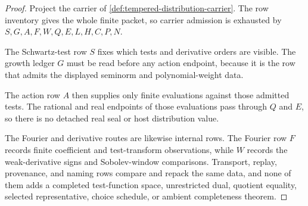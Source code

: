 \begin{proof}
Project the carrier of \autoref{def:tempered-distribution-carrier}. The row inventory gives the whole finite packet, so carrier admission is exhausted by $S,G,A,F,W,Q,E,L,H,C,P,N$.

The Schwartz-test row $S$ fixes which tests and derivative orders are visible. The growth ledger $G$ must be read before any action endpoint, because it is the row that admits the displayed seminorm and polynomial-weight data.

The action row $A$ then supplies only finite evaluations against those admitted tests. The rational and real endpoints of those evaluations pass through $Q$ and $E$, so there is no detached real seal or host distribution value.

The Fourier and derivative routes are likewise internal rows. The Fourier row $F$ records finite coefficient and test-transform observations, while $W$ records the weak-derivative signs and Sobolev-window comparisons. Transport, replay, provenance, and naming rows compare and repack the same data, and none of them adds a completed test-function space, unrestricted dual, quotient equality, selected representative, choice schedule, or ambient completeness theorem.
\end{proof}

